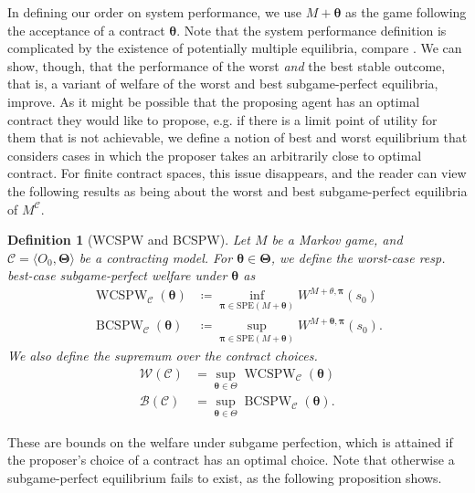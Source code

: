 \documentclass[referee,sn-basic]{sn-jnl}
\newcommand{\bld}[1]{\boldsymbol{#1}}
\newcommand{\btheta}{\boldsymbol{\theta}}
\theoremstyle{thmstyleone}%
\theoremstyle{thmstyletwo}%
\theoremstyle{thmstylethree}%
\newtheorem{definition}{Definition}%
\begin{document}
In defining our order on system performance, we use $M+\btheta$ as the game following the acceptance of a contract $\btheta$. Note that the system performance definition is complicated by the existence of potentially multiple equilibria, compare \cite{folktheorem}. We can show, though, that the performance of the worst \emph{and} the best stable outcome, that is, a variant of welfare of the worst and best subgame-perfect equilibria, improve. As it might be possible that the proposing agent has an optimal contract they would like to propose, e.g. if there is a limit point of utility for them that is not achievable, we define a notion of best and worst equilibrium that considers cases in which the proposer takes an arbitrarily close to optimal contract. For finite contract spaces, this issue disappears, and the reader can view the following results as being about the worst and best subgame-perfect equilibria of $M^{\mathcal C}$.
\begin{definition}[WCSPW and BCSPW]
    Let $M$ be a Markov game, and $\mathcal{C} = \langle O_0, \bld\Theta\rangle$ be a contracting model. For $\btheta \in \bld\Theta$, we define the \emph{worst-case} resp. \emph{best-case subgame-perfect welfare under $\btheta$} as
    \begin{equation}
    \begin{split}
    \operatorname{WCSPW}_\mathcal{C}(\btheta) &\coloneqq  \inf_{\bld\pi \in \mathrm{SPE}(M+\btheta)} W^{M+\theta, \bld\pi}(s_0)\\
    \operatorname{BCSPW}_\mathcal{C}(\btheta) &\coloneqq  \sup_{\bld\pi \in \mathrm{SPE}(M+\btheta)} W^{M+\btheta, \bld\pi}(s_0).
    \end{split}\label{eq:innersupattained}
    \end{equation}
    We also define the supremum over the contract choices.
    \begin{equation}
    \begin{split}
   \mathcal{W}(\mathcal{C}) &= \sup_{\btheta \in \Theta} \operatorname{WCSPW}_\mathcal{C}(\btheta)\\
    \mathcal{B}(\mathcal{C}) &= \sup_{\btheta \in \Theta} \operatorname{BCSPW}_\mathcal{C}(\btheta).\nonumber
    \end{split}\label{eq:attainmentofsupremal} 
    \end{equation}
\end{definition}
These are bounds on the welfare under subgame perfection, which is attained if the proposer's choice of a contract has an optimal choice. Note that otherwise a subgame-perfect equilibrium fails to exist, as the following proposition shows.
\end{document}
